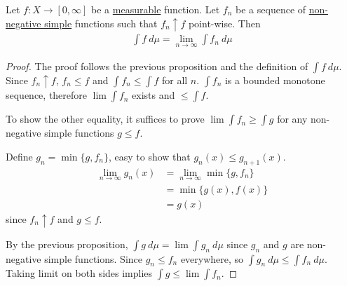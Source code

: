 \documentclass[11pt]{article}
\begin{document}
	\begin{proposition}
		Let $f: X \to [0, \infty]$ be a \ul{measurable} function. Let $f_n$ be a sequence of \ul{non-negative simple} functions such that $f_n \uparrow f$ point-wise. Then
		\begin{align}
			\int f\ d\mu = \lim_{n \to \infty} \int f_n\ d\mu
		\end{align}
		
		\begin{proof}
			The proof follows the previous proposition and the definition of $\int f\ d\mu$.
			Since $f_n \uparrow f$, $f_n \leq f$ and $\int f_n \leq \int f$ for all $n$. $\int f_n$ is a bounded monotone sequence, therefore $\lim \int f_n$ exists and $\leq \int f$.
			
			To show the other equality, it suffices to prove $\lim \int f_n \geq \int g$ for any non-negative simple functions $g \leq f$.
			
			Define $g_n = \min \{g, f_n\}$, easy to show that $g_n(x) \leq g_{n+1}(x)$.
			\begin{align}
				\lim_{n\to\infty} g_n(x) &= \lim_{n\to\infty} \min \{g, f_n\} \\
				&= \min\{g(x), f(x)\} \\
				&= g(x)
			\end{align}
			since $f_n \uparrow f$ and $g \leq f$.
			
			By the previous proposition, $\int g\ d\mu = \lim \int g_n\ d\mu$ since $g_n$ and $g$ are non-negative simple functions. Since $g_n \leq f_n$ everywhere, so $\int g_n\ d\mu \leq \int f_n\ d\mu$.
			Taking limit on both sides implies $\int g \leq \lim \int f_n$.
		\end{proof}
	\end{proposition}
	
\end{document}
